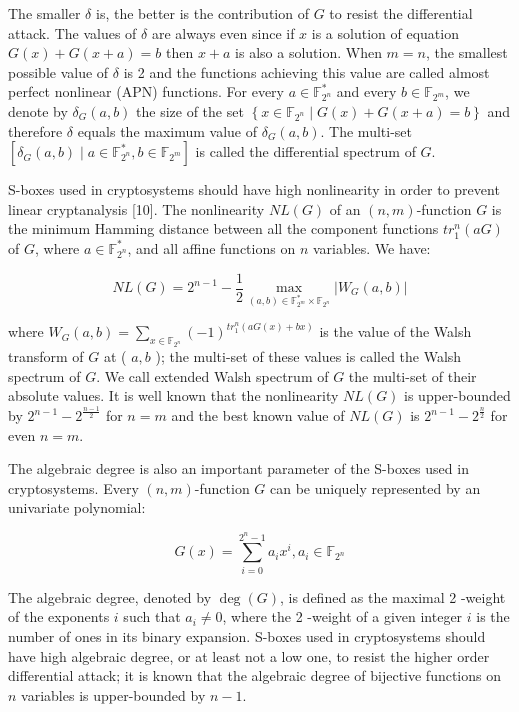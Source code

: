 \documentclass[10pt]{article}
\begin{document}
The smaller $\delta$ is, the better is the contribution of $G$ to resist the differential attack. The values of $\delta$ are always even since if $x$ is a solution of equation $G(x)+G(x+a)=b$ then $x+a$ is also a solution. When $m=n$, the smallest possible value of $\delta$ is 2 and the functions achieving this value are called almost perfect nonlinear (APN) functions. For every $a \in \mathbb{F}_{2^{n}}^{*}$ and every $b \in \mathbb{F}_{2^{m}}$, we denote by $\delta_{G}(a, b)$ the size of the set $\left\{x \in \mathbb{F}_{2^{n}} \mid G(x)+G(x+a)=b\right\}$ and\\
therefore $\delta$ equals the maximum value of $\delta_{G}(a, b)$. The multi-set $\left[\delta_{G}(a, b) \mid a \in \mathbb{F}_{2^{n}}^{*}, b \in \mathbb{F}_{2^{m}}\right]$ is called the differential spectrum of $G$.

S-boxes used in cryptosystems should have high nonlinearity in order to prevent linear cryptanalysis [10]. The nonlinearity $N L(G)$ of an $(n, m)$-function $G$ is the minimum Hamming distance between all the component functions $t r_{1}^{n}(a G)$ of $G$, where $a \in \mathbb{F}_{2^{n}}^{*}$, and all affine functions on $n$ variables. We have:

$$
N L(G)=2^{n-1}-\frac{1}{2} \max _{(a, b) \in \mathbb{F}_{2^{m}}^{*} \times \mathbb{F}_{2^{n}}}\left|W_{G}(a, b)\right|
$$

where $W_{G}(a, b)=\sum_{x \in \mathbb{F}_{2^{n}}}(-1)^{t r_{1}^{n}(a G(x)+b x)}$ is the value of the Walsh transform of $G$ at ( $a, b$ ); the multi-set of these values is called the Walsh spectrum of $G$. We call extended Walsh spectrum of $G$ the multi-set of their absolute values. It is well known that the nonlinearity $N L(G)$ is upper-bounded by $2^{n-1}-2^{\frac{n-1}{2}}$ for $n=m$ and the best known value of $N L(G)$ is $2^{n-1}-2^{\frac{n}{2}}$ for even $n=m$.

The algebraic degree is also an important parameter of the S-boxes used in cryptosystems. Every $(n, m)$-function $G$ can be uniquely represented by an univariate polynomial:

$$
G(x)=\sum_{i=0}^{2^{n}-1} a_{i} x^{i}, a_{i} \in \mathbb{F}_{2^{n}}
$$

The algebraic degree, denoted by $\operatorname{deg}(G)$, is defined as the maximal 2 -weight of the exponents $i$ such that $a_{i} \neq 0$, where the 2 -weight of a given integer $i$ is the number of ones in its binary expansion. S-boxes used in cryptosystems should have high algebraic degree, or at least not a low one, to resist the higher order differential attack; it is known that the algebraic degree of bijective functions on $n$ variables is upper-bounded by $n-1$.
\end{document}
